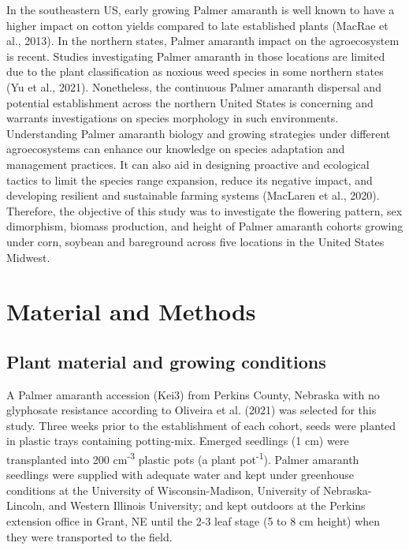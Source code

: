 \documentclass[utf8]{frontiersSCNS}
\begin{document}
In the southeastern US, early growing Palmer amaranth is well known to
have a higher impact on cotton yields compared to late established
plants (MacRae et al., 2013). In the northern states, Palmer amaranth
impact on the agroecosystem is recent. Studies investigating Palmer
amaranth in those locations are limited due to the plant classification
as noxious weed species in some northern states (Yu et al., 2021).
Nonetheless, the continuous Palmer amaranth dispersal and potential
establishment across the northern United States is concerning and
warrants investigations on species morphology in such environments.
Understanding Palmer amaranth biology and growing strategies under
different agroecosystems can enhance our knowledge on species adaptation
and management practices. It can also aid in designing proactive and
ecological tactics to limit the species range expansion, reduce its
negative impact, and developing resilient and sustainable farming
systems (MacLaren et al., 2020). Therefore, the objective of this study
was to investigate the flowering pattern, sex dimorphism, biomass
production, and height of Palmer amaranth cohorts growing under corn,
soybean and bareground across five locations in the United States
Midwest.

\hypertarget{material-and-methods}{%
\section*{Material and Methods}\label{material-and-methods}}

\hypertarget{plant-material-and-growing-conditions}{%
\subsection*{Plant material and growing
conditions}\label{plant-material-and-growing-conditions}}

A Palmer amaranth accession (Kei3) from Perkins County, Nebraska with no
glyphosate resistance according to Oliveira et al. (2021) was selected
for this study. Three weeks prior to the establishment of each cohort,
seeds were planted in plastic trays containing potting-mix. Emerged
seedlings (1 cm) were transplanted into 200 cm\textsuperscript{-3}
plastic pots (a plant pot\textsuperscript{-1}). Palmer amaranth
seedlings were supplied with adequate water and kept under greenhouse
conditions at the University of Wisconsin-Madison, University of
Nebraska-Lincoln, and Western Illinois University; and kept outdoors at
the Perkins extension office in Grant, NE until the 2-3 leaf stage (5 to
8 cm height) when they were transported to the field.
\end{document}
